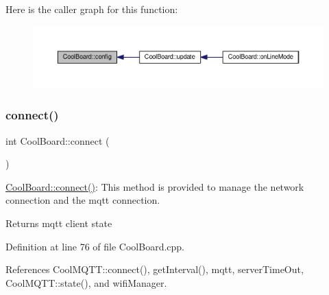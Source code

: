 Here is the caller graph for this function\+:
\nopagebreak
\begin{figure}[H]
\begin{center}
\leavevmode
\includegraphics[width=350pt]{classCoolBoard_a583a874c09c07e70a6eb9229fc4beddb_icgraph}
\end{center}
\end{figure}
\mbox{\label{classCoolBoard_a519de78b807f8ec6463ff484eb925918}} 
\subsubsection{\texorpdfstring{connect()}{connect()}}
{\footnotesize\ttfamily int Cool\+Board\+::connect (\begin{DoxyParamCaption}{ }\end{DoxyParamCaption})}

\hyperlink{classCoolBoard_a519de78b807f8ec6463ff484eb925918}{Cool\+Board\+::connect()}\+: This method is provided to manage the network connection and the mqtt connection.

\begin{DoxyReturn}{Returns}
mqtt client state 
\end{DoxyReturn}


Definition at line 76 of file Cool\+Board.\+cpp.



References Cool\+M\+Q\+T\+T\+::connect(), get\+Interval(), mqtt, server\+Time\+Out, Cool\+M\+Q\+T\+T\+::state(), and wifi\+Manager.



